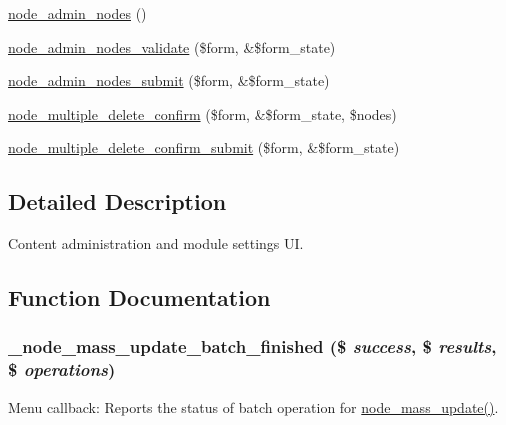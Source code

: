 \begin{DoxyCompactItemize}
\item 
\hyperlink{group__forms_ga3fb56c702a3c16eddd2fcd8ccd3e4adb}{node\_\-admin\_\-nodes} ()
\item 
\hyperlink{node_8admin_8inc_a32a9ea91250aaf84de44f784a3569944}{node\_\-admin\_\-nodes\_\-validate} (\$form, \&\$form\_\-state)
\item 
\hyperlink{node_8admin_8inc_a5f159cfed0d6cce65d5d70747efec391}{node\_\-admin\_\-nodes\_\-submit} (\$form, \&\$form\_\-state)
\item 
\hyperlink{group__forms_ga25cc06a5aa3aa17eadc5a8a97e7c5e9e}{node\_\-multiple\_\-delete\_\-confirm} (\$form, \&\$form\_\-state, \$nodes)
\item 
\hyperlink{node_8admin_8inc_ab8a2e11edeef2797ca739f94d1eb1af9}{node\_\-multiple\_\-delete\_\-confirm\_\-submit} (\$form, \&\$form\_\-state)
\end{DoxyCompactItemize}


\subsection{Detailed Description}
Content administration and module settings UI. 

\subsection{Function Documentation}
\hypertarget{node_8admin_8inc_ad95a05e860d4e44deb46b8af92a7fe25}{
\subsubsection[{\_\-node\_\-mass\_\-update\_\-batch\_\-finished}]{\setlength{\rightskip}{0pt plus 5cm}\_\-node\_\-mass\_\-update\_\-batch\_\-finished (\$ {\em success}, \/  \$ {\em results}, \/  \$ {\em operations})}}
\label{node_8admin_8inc_ad95a05e860d4e44deb46b8af92a7fe25}
Menu callback: Reports the status of batch operation for \hyperlink{node_8admin_8inc_ab40a38d08f170c418b0dac544d8ba97c}{node\_\-mass\_\-update()}.


